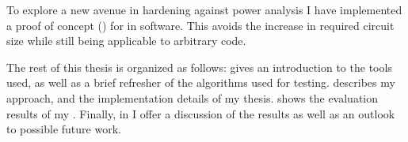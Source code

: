 To explore a new avenue in hardening against power analysis I have implemented a proof of concept (\poc{}) for \dual{} in software.
This avoids the increase in required circuit size while still being applicable to arbitrary code.

The rest of this thesis is organized as follows:
 gives an introduction to the tools used, as well as a brief refresher of the algorithms used for testing.
 describes my approach, and  the implementation details of my thesis.
 shows the evaluation results of my \poc{}.
Finally, in  I offer a discussion of the results as well as an outlook to possible future work.
